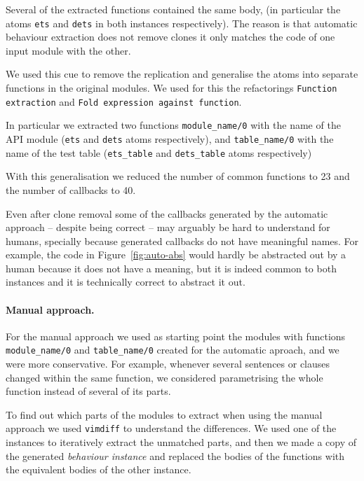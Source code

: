 Several of the extracted functions contained the same body, (in particular the 
atoms \texttt{ets} and \texttt{dets} in both instances respectively). The reason 
is that automatic behaviour extraction does not remove clones it only matches 
the code of one input module with the other.

We used this cue to remove the replication and generalise the atoms into 
separate functions in the original modules. We used for this the refactorings 
\texttt{Function extraction} and \texttt{Fold expression against function}.

In particular we extracted two functions \texttt{module\_name/0} with 
the name of the API module (\texttt{ets} and \texttt{dets} atoms respectively), 
and \texttt{table\_name/0} with the name of the test table (\texttt{ets\_table} 
and \texttt{dets\_table} atoms respectively)

With this generalisation we reduced the number of common functions to 23 and 
the number of callbacks to 40.

Even after clone removal some of the callbacks generated by the automatic 
approach -- despite being correct -- may arguably be hard to understand for 
humans, specially because generated callbacks do not have meaningful names. For 
example, the code in Figure~\ref{fig:auto-abs} would hardly be abstracted out by 
a human because it does not have a meaning, but it is indeed common to both 
instances and it is technically correct to abstract it out.

\paragraph{Manual approach.}

For the manual approach we used as starting point the modules with functions 
\texttt{module\_name/0} and \texttt{table\_name/0} created for the automatic 
aproach, and we were more conservative. For example, whenever several sentences 
or clauses changed within the same function, we considered parametrising the 
whole function instead of several of its parts.

To find out which parts of the modules to extract when using the manual 
approach we used \texttt{vimdiff} to understand the differences. We used one of 
the instances to iteratively extract the unmatched parts, and then we made a 
copy of the generated \emph{behaviour instance} and replaced the bodies of the 
functions with the equivalent bodies of the other instance.

